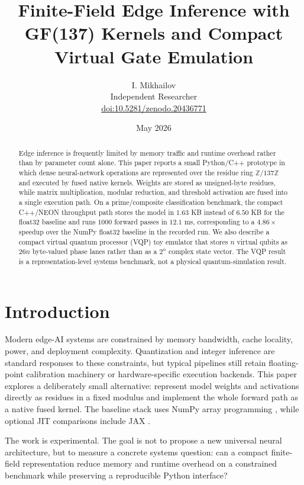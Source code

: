 \documentclass[11pt]{article}
\title{Finite-Field Edge Inference with GF(137) Kernels and Compact Virtual Gate Emulation}
\author{I. Mikhailov\\
\small Independent Researcher\\
\small \href{https://doi.org/10.5281/zenodo.20436771}{doi:10.5281/zenodo.20436771}}
\date{May 2026}
\begin{document}
\maketitle

\begin{abstract}
Edge inference is frequently limited by memory traffic and runtime overhead
rather than by parameter count alone.  This paper reports a small Python/C++
prototype in which dense neural-network operations are represented over the
residue ring $\mathbb{Z}/137\mathbb{Z}$ and executed by fused native kernels.
Weights are stored as unsigned-byte residues, while matrix multiplication,
modular reduction, and threshold activation are fused into a single execution
path.  On a prime/composite classification benchmark, the compact C++/NEON
throughput path stores the model in $1.63$ KB instead of $6.50$ KB for the
float32 baseline and runs $1000$ forward passes in $12.1$ ms, corresponding to
a $4.86\times$ speedup over the NumPy float32 baseline in the recorded run.  We
also describe a compact virtual quantum processor (VQP) toy emulator that
stores $n$ virtual qubits as $26n$ byte-valued phase lanes rather than as a
$2^n$ complex state vector.  The VQP result is a representation-level systems
benchmark, not a physical quantum-simulation result.
\end{abstract}

\section{Introduction}

Modern edge-AI systems are constrained by memory bandwidth, cache locality,
power, and deployment complexity.  Quantization and integer inference are
standard responses to these constraints, but typical pipelines still retain
floating-point calibration machinery or hardware-specific execution backends.
This paper explores a deliberately small alternative: represent model weights
and activations directly as residues in a fixed modulus and implement the whole
forward path as a native fused kernel.  The baseline stack uses NumPy
array programming \cite{numpy2020}, while optional JIT comparisons include JAX
\cite{jax2018}.

The work is experimental.  The goal is not to propose a new universal neural
architecture, but to measure a concrete systems question: can a compact
finite-field representation reduce memory and runtime overhead on a constrained
benchmark while preserving a reproducible Python interface?
\end{document}
